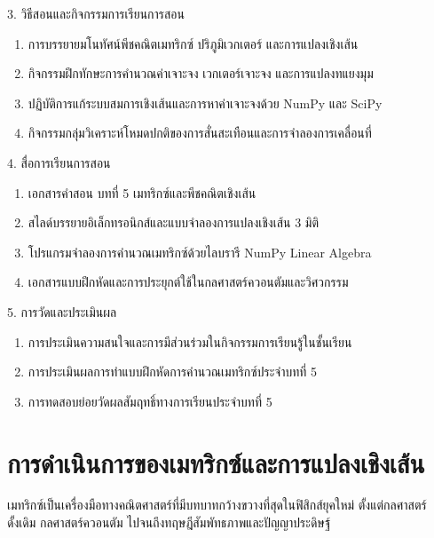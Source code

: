 \newpage

\begin{planbox}[colframe=rbruNavy!85!black, colbacktitle=rbruNavy!85!black]{3. วิธีสอนและกิจกรรมการเรียนการสอน}
\begin{enumerate}[topsep=2pt, itemsep=1pt, partopsep=0pt, parsep=0pt, leftmargin=1.5em]
    \item การบรรยายมโนทัศน์พีชคณิตเมทริกซ์ ปริภูมิเวกเตอร์ และการแปลงเชิงเส้น
    \item กิจกรรมฝึกทักษะการคำนวณค่าเจาะจง เวกเตอร์เจาะจง และการแปลงทแยงมุม
    \item ปฏิบัติการแก้ระบบสมการเชิงเส้นและการหาค่าเจาะจงด้วย NumPy และ SciPy
    \item กิจกรรมกลุ่มวิเคราะห์โหมดปกติของการสั่นสะเทือนและการจำลองการเคลื่อนที่
\end{enumerate}
\end{planbox}

\begin{planbox}[colframe=rbruGold!90!black, colbacktitle=rbruGold!90!black]{4. สื่อการเรียนการสอน}
\begin{enumerate}[topsep=2pt, itemsep=1pt, partopsep=0pt, parsep=0pt, leftmargin=1.5em]
    \item เอกสารคำสอน บทที่ 5 เมทริกซ์และพีชคณิตเชิงเส้น
    \item สไลด์บรรยายอิเล็กทรอนิกส์และแบบจำลองการแปลงเชิงเส้น 3 มิติ
    \item โปรแกรมจำลองการคำนวณเมทริกซ์ด้วยไลบรารี NumPy Linear Algebra
    \item เอกสารแบบฝึกหัดและการประยุกต์ใช้ในกลศาสตร์ควอนตัมและวิศวกรรม
\end{enumerate}
\end{planbox}

\begin{planbox}[colframe=rbruSlate, colbacktitle=rbruSlate]{5. การวัดและประเมินผล}
\begin{enumerate}[topsep=2pt, itemsep=1pt, partopsep=0pt, parsep=0pt, leftmargin=1.5em]
    \item การประเมินความสนใจและการมีส่วนร่วมในกิจกรรมการเรียนรู้ในชั้นเรียน
    \item การประเมินผลการทำแบบฝึกหัดการคำนวณเมทริกซ์ประจำบทที่ 5
    \item การทดสอบย่อยวัดผลสัมฤทธิ์ทางการเรียนประจำบทที่ 5
\end{enumerate}
\end{planbox}
\clearpage

\section{การดำเนินการของเมทริกซ์และการแปลงเชิงเส้น}
เมทริกซ์เป็นเครื่องมือทางคณิตศาสตร์ที่มีบทบาทกว้างขวางที่สุดในฟิสิกส์ยุคใหม่ ตั้งแต่กลศาสตร์ดั้งเดิม กลศาสตร์ควอนตัม ไปจนถึงทฤษฎีสัมพัทธภาพและปัญญาประดิษฐ์


